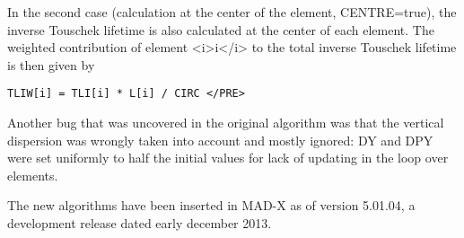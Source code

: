 In the second case (calculation at the center of the element,
CENTRE=true), the inverse Touschek lifetime is also calculated at the
center of each element. The weighted contribution of element <i>i</i> to
the total inverse Touschek lifetime is then given by 
\begin{verbatim}
TLIW[i] = TLI[i] * L[i] / CIRC </PRE>
\end{verbatim}

Another bug that was uncovered in the original algorithm was that the
vertical dispersion was wrongly taken into account and mostly ignored:
DY and DPY were set uniformly to half the initial values for lack of
updating in the loop over elements.  

The new algorithms have been inserted in MAD-X as of version 5.01.04, a
development release dated early december 2013.  

